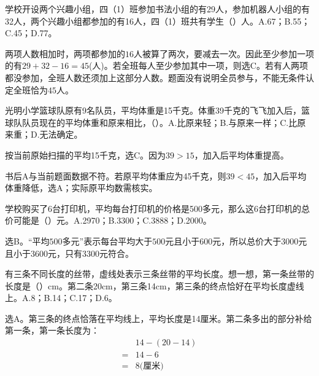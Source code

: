 学校开设两个兴趣小组，四（1）班参加书法小组的有29人，参加机器人小组的有32人，两个兴趣小组都参加的有16人，四（1）班共有学生（\hspace{1.8em}）人。A.67；B.55；C.45；D.77。\par
\begin{BookAnswer}
两项人数相加时，两项都参加的\(16\)人被算了两次，要减去一次。因此至少参加一项的有\(29+32-16=45\)(人)。若全班每人至少参加其中一项，则选C。若有人两项都没参加，全班人数还须加上这部分人数。题面没有说明全员参与，不能无条件认定全班恰为\(45\)人。
\end{BookAnswer}

光明小学篮球队原有9名队员，平均体重是15千克。体重39千克的飞飞加入后，篮球队队员现在的平均体重和原来相比，（\hspace{1.8em}）。A.比原来轻；B.与原来一样；C.比原来重；D.无法确定。\par
\begin{BookAnswer}
按当前原始扫描的平均15千克，选C。因为\(39>15\)，加入后平均体重提高。\par 书后A与当前题面数据不符。若原平均体重应为45千克，则\(39<45\)，加入后平均体重降低，选A；实际原平均数需核实。
\end{BookAnswer}

学校购买了6台打印机，平均每台打印机的价格是500多元，那么这6台打印机的总价可能是（\hspace{1.8em}）元。A.2970；B.3300；C.3888；D.2000。\par
\begin{BookAnswer}
选B。“平均\(500\)多元”表示每台平均大于\(500\)元且小于\(600\)元，所以总价大于\(3000\)元且小于\(3600\)元，只有\(3300\)元符合。
\end{BookAnswer}

有三条不同长度的丝带，虚线处表示三条丝带的平均长度。想一想，第一条丝带的长度是（\hspace{1.8em}）cm。第二条20cm，第三条14cm，第三条的终点恰好在平均长度虚线上。A.8；B.14；C.17；D.6。\par
{}
\begin{BookAnswer}
选A。第三条的终点恰落在平均线上，平均长度是14厘米。第二条多出的部分补给第一条，第一条长度为：\[\begin{aligned}&14-(20-14)\\={}&14-6\\={}&8\text{(厘米)}\end{aligned}\]
\end{BookAnswer}

